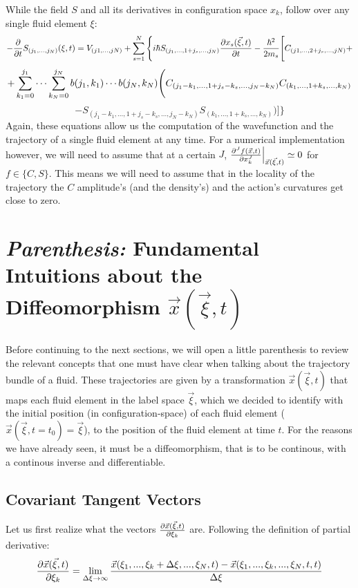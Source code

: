 \documentclass[11pt, a4paper]{article} %
\begin{document}
While the field $S$ and all its derivatives in configuration space $x_k$, follow over any single fluid element $\xi$:\vspace{-0.1cm}
\begin{equation}\label{infchain.HJE.L}
-\pdv{}{t}S_{(j_1,...,j_N)}(\xi,t)=V_{(j1,...,jN)}+\sum_{s=1}^N\Bigg\{ i\hbar S_{(j_1,...,1+j_s,...,j_N)}\pdv{x_s(\vec{\xi},t)}{t}-\frac{\hbar^2}{2m_s} \Bigg[ C_{(j1,...,2+j_s,...,jN)}+\vspace{-0.1cm}
\end{equation}
$$
+\sum_{k_1=0}^{j_1}\cdots\sum_{k_N=0}^{j_N} b(j_1,k_1)\cdots b(j_N,k_N) \Bigg( C_{(j_1-k_1,...,1+j_s-k_s,...,j_N-k_N)}C_{(k_1,...,1+k_s,...,k_N)} \vspace{-0.1cm}
$$
$$
-S_{(j_1-k_1,...,1+j_s-k_s,...,j_N-k_N)}S_{(k_1,...,1+k_s,...,k_N)}  \Bigg)\Bigg]\Bigg\}
$$
Again, these equations allow us the computation of the wavefunction and the trajectory of a single fluid element at any time. For a numerical implementation however, we will need to assume that at a certain $J$, $\pdv[J]{f(\vec{x},t)}{x_k}\Big\rvert_{\vec{x}(\vec{\xi},t)}\simeq 0$ for $f\in\{ C,S\}$. This means we will need to assume that in the locality of the trajectory the $C$ amplitude's (and the density's) and the action's curvatures get close to zero.\\


\section*{{\em Parenthesis: }Fundamental Intuitions about the Diffeomorphism $\vec{x}(\vec{\xi},t)$}

Before continuing to the next sections, we will open a little parenthesis to review the relevant concepts that one must have clear when talking about the trajectory bundle of a fluid. These trajectories are given by a transformation $\vec{x}(\vec{\xi},t)$ that maps each fluid element in the label space $\vec{\xi}$, which we decided to identify with the initial position (in configuration-space) of each fluid element ($\vec{x}(\vec{\xi},t=t_0)=\vec{\xi}$), to the position of the fluid element at time $t$. For the reasons we have already seen, it must be a diffeomorphism, that is to be continous, with a continous inverse and differentiable. \vspace{-0.3cm}
\subsection*{ Covariant Tangent Vectors \vspace{-0.3cm}}
Let us first realize what the vectors $\pdv{\vec{x}(\vec{\xi},t)}{\xi_k}$ are. Following the definition of partial derivative:
\begin{equation}
\pdv{\vec{x}(\vec{\xi},t)}{\xi_k}=\lim_{\Delta \xi \rightarrow \infty} \frac{\vec{x}(\xi_1,...,\xi_k+\Delta \xi,...,\xi_N,t)-\vec{x}(\xi_1,...,\xi_k,...,\xi_N,t,t)}{\Delta \xi}
\end{equation}
\end{document}
